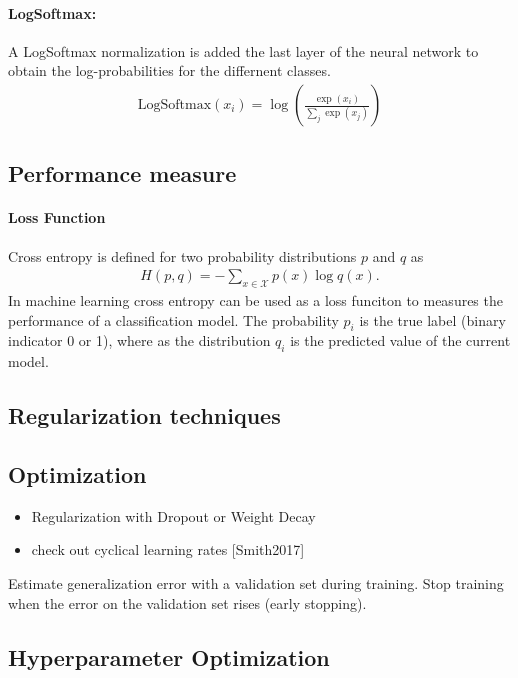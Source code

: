 \documentclass{article}
\begin{document}
\paragraph{LogSoftmax:}

A LogSoftmax normalization is added the last layer of the neural network to obtain the log-probabilities for the differnent classes.
\begin{align}
\text{LogSoftmax}(x_i) = \log\left(\frac{\exp{(x_i)}}{\sum_j \exp(x_j)}\right)
\end{align} 



\subsection{Performance measure}

\paragraph{Loss Function}
Cross entropy is defined for two probability distributions $p$ and $q$ as
\begin{align}
H(p,q) = - \sum_{x \in \mathcal X} p(x) \log q(x).
\end{align} 
In machine learning cross entropy can be used as a loss funciton to measures the performance of a classification model. The probability $p_{i}$ is the true label (binary indicator 0 or 1), where as the distribution $q_{i}$ is the predicted value of the current model. 


\subsection{Regularization techniques}


\subsection{Optimization}

\begin{itemize}
\item Regularization with Dropout or Weight Decay
\item check out cyclical learning rates \cite{Smith2017}[Smith2017]
\end{itemize}


Estimate generalization error with a validation set during training. Stop training when the error on the validation set rises (early stopping).


\subsection{Hyperparameter Optimization}
\end{document}
